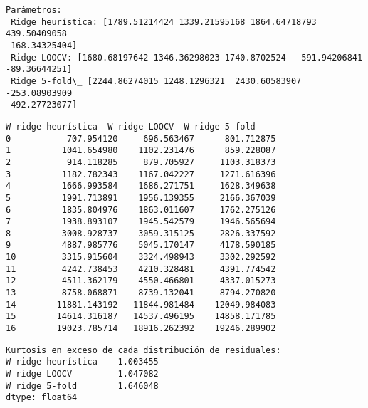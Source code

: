 \documentclass[11pt]{article}
\begin{document}
    \begin{Verbatim}[commandchars=\\\{\}]
Parámetros:
 Ridge heurística: [1789.51214424 1339.21595168 1864.64718793  439.50409058
-168.34325404]
 Ridge LOOCV: [1680.68197642 1346.36298023 1740.8702524   591.94206841
-89.36644251]
 Ridge 5-fold\_ [2244.86274015 1248.1296321  2430.60583907 -253.08903909
-492.27723077]
    \end{Verbatim}

    
    \begin{Verbatim}[commandchars=\\\{\}]
    W ridge heurística  W ridge LOOCV  W ridge 5-fold
0           707.954120     696.563467      801.712875
1          1041.654980    1102.231476      859.228087
2           914.118285     879.705927     1103.318373
3          1182.782343    1167.042227     1271.616396
4          1666.993584    1686.271751     1628.349638
5          1991.713891    1956.139355     2166.367039
6          1835.804976    1863.011607     1762.275126
7          1938.893107    1945.542579     1946.565694
8          3008.928737    3059.315125     2826.337592
9          4887.985776    5045.170147     4178.590185
10         3315.915604    3324.498943     3302.292592
11         4242.738453    4210.328481     4391.774542
12         4511.362179    4550.466801     4337.015273
13         8758.068871    8739.132041     8794.270820
14        11881.143192   11844.981484    12049.984083
15        14614.316187   14537.496195    14858.171785
16        19023.785714   18916.262392    19246.289902
    \end{Verbatim}

    
    \begin{Verbatim}[commandchars=\\\{\}]
Kurtosis en exceso de cada distribución de residuales:
W ridge heurística    1.003455
W ridge LOOCV         1.047082
W ridge 5-fold        1.646048
dtype: float64
    \end{Verbatim}

    \begin{center}
    \end{center}
    { \hspace*{\fill} \\}
    
    \begin{center}
    \end{center}
    { \hspace*{\fill} \\}
    
\end{document}
